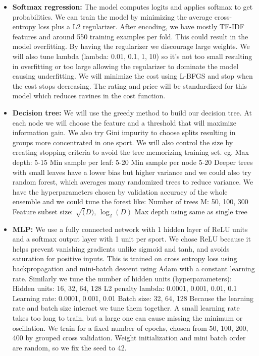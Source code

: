 \documentclass[12pt]{article}
\begin{document}
\begin{itemize}
  \item \textbf{Softmax regression:} The model computes logits and applies softmax to get probabilities. We can train the model by minimizing the average cross-entropy loss plus a L2 regularizer. After encoding, we have mostly TF-IDF features and around 550 training examples per fold. This could result in the model overfitting. By having the regularizer we discourage large weights. We will also tune lambda (lambda: 0.01, 0.1, 1, 10) so it's not too small resulting in overfitting or too large allowing the regularizer to dominate the model causing underfitting. We will minimize the cost using L-BFGS and stop when the cost stops decreasing. The rating and price will be standardized for this model which reduces ravines in the cost function.
  \\
  \item \textbf{Decision tree:} We will use the greedy method to build our decision tree. At each node we will choose the feature and a threshold that will maximize information gain. We also try Gini impurity to choose splits resulting in groups more concentrated in one sport. We will also control the size by creating stopping criteria to avoid the tree memorizing training set. eg.
Max depth: 5-15
Min sample per leaf: 5-20
Min sample per node 5-20
Deeper trees with small leaves have a lower bias but higher variance and we could also try random forest, which averages many randomized trees to reduce variance. We have the hyperparameters chosen by validation accuracy of the whole ensemble and we could tune the forest like:
Number of trees M: 50, 100, 300
Feature subset size: $\sqrt(D)$, $\log_2(D)$
Max depth using same as single tree
\\
  \item \textbf{MLP:} We use a fully connected network with 1 hidden layer of ReLU units and a softmax output layer with 1 unit per sport. We chose ReLU because it helps prevent vanishing gradients unlike sigmoid and tanh, and avoids saturation for positive inputs. This is trained on cross entropy loss using backpropagation and mini-batch descent using Adam with a constant learning rate. Similarly we tune the number of hidden units (hyperparameters):
Hidden units: 16, 32, 64, 128
L2 penalty lambda: 0.0001, 0.001, 0.01, 0.1
Learning rate: 0.0001, 0.001, 0.01
Batch size: 32, 64, 128
Because the learning rate and batch size interact we tune them together. A small learning rate takes too long to train, but a large one can cause missing the minimum or oscillation. We train for a fixed number of epochs, chosen from {50, 100, 200, 400} by grouped cross validation. Weight initialization and mini batch order are random, so we fix the seed to 42. 
\\
\end{itemize}
\end{document}
